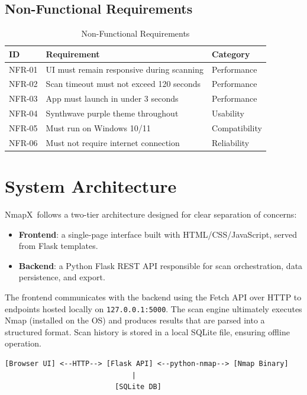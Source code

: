 \documentclass[12pt, a4paper]{report}
\newcommand{\NmapX}{NmapX}
\begin{document}
\subsection{Non-Functional Requirements}
\begin{table}[H]
  \centering
  \caption{Non-Functional Requirements}
  \label{tab:nonfunctional-requirements}
  \begin{tabularx}{\textwidth}{@{}lXl@{}}
    \toprule
    \textbf{ID} & \textbf{Requirement} & \textbf{Category} \\
    \midrule
    NFR-01 & UI must remain responsive during scanning & Performance \\
    NFR-02 & Scan timeout must not exceed 120 seconds & Performance \\
    NFR-03 & App must launch in under 3 seconds & Performance \\
    NFR-04 & Synthwave purple theme throughout & Usability \\
    NFR-05 & Must run on Windows 10/11 & Compatibility \\
    NFR-06 & Must not require internet connection & Reliability \\
    \bottomrule
  \end{tabularx}
\end{table}

\section{System Architecture}
\NmapX\ follows a two-tier architecture designed for clear separation of concerns:
\begin{itemize}[leftmargin=2.2em]
  \item \textbf{Frontend}: a single-page interface built with HTML/CSS/JavaScript, served from Flask templates.
  \item \textbf{Backend}: a Python Flask REST API responsible for scan orchestration, data persistence, and export.
\end{itemize}

The frontend communicates with the backend using the Fetch API over HTTP to endpoints hosted locally on \texttt{127.0.0.1:5000}. The scan engine ultimately executes Nmap (installed on the OS) and produces results that are parsed into a structured format. Scan history is stored in a local SQLite file, ensuring offline operation.

\begin{mdframed}[linecolor=synthpurple,linewidth=1pt,backgroundcolor=lightgray]
\begin{verbatim}
[Browser UI] <--HTTP--> [Flask API] <--python-nmap--> [Nmap Binary]
                              |
                          [SQLite DB]
\end{verbatim}
\end{mdframed}
\end{document}
